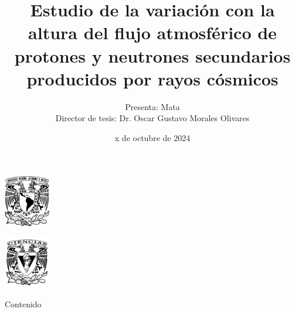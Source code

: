 \documentclass[13pt, aspectratio=169]{beamer}
\title{\Large Estudio de la variación con la altura del flujo atmosférico de protones y neutrones secundarios producidos por rayos cósmicos}
\author{Presenta: Mata \\ 
    \scriptsize Director de tesis: Dr. Oscar Gustavo Morales Olivares}
\institute{
    \inst{
        \footnotesize Universidad Nacional Autónoma de México 
    }
    \inst{
        \footnotesize Facultad de Ciencias
    }
}
\date{\scriptsize x de octubre de 2024}
\begin{document}
\begin{frame}[plain]
    \begin{minipage}[t]{0.1\linewidth}
        \includegraphics[width=2cm]{Figures/unam.pdf}
    \end{minipage}
    \hfill
    \begin{minipage}[t]{0.1\linewidth}
        \includegraphics[width=2cm]{Figures/ciencias.pdf}
    \end{minipage}
    \vspace{2cm}
    \titlepage
\end{frame}



    
    \begin{frame}{Contenido} %
        \tableofcontents
    \end{frame}
    
	
    
	
	
	
    
	
	
\end{document}
